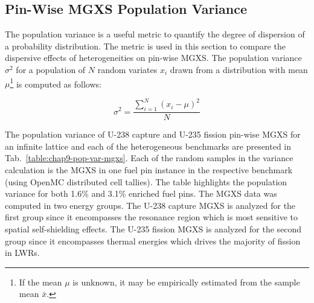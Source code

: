 \subsection{Pin-Wise MGXS Population Variance}
\label{subsec:chap9-pop-var}

The population variance is a useful metric to quantify the degree of dispersion of a probability distribution. The metric is used in this section to compare the dispersive effects of heterogeneities on pin-wise \ac{MGXS}. The population variance $\sigma^2$ for a population of $N$ random variates $x_{i}$ drawn from a distribution with mean $\mu$\footnote{If the mean $\mu$ is unknown, it may be empirically estimated from the sample mean $\bar{x}$.} is computed as follows:

\begin{equation}
\label{eqn:chap9-pop-var}
\sigma^2 = \frac{\displaystyle\sum\limits_{i=1}^{N}(x_{i} - \mu)^{2}}{N}
\end{equation}

The population variance of U-238 capture and U-235 fission pin-wise \ac{MGXS} for an infinite lattice and each of the heterogeneous benchmarks are presented in Tab.~\ref{table:chap9-pop-var-mgxs}. Each of the random samples in the variance calculation is the \ac{MGXS} in one fuel pin instance in the respective benchmark (using OpenMC distributed cell tallies). The table highlights the population variance for both 1.6\% and 3.1\% enriched fuel pins. The \ac{MGXS} data was computed in two energy groups. The U-238 capture \ac{MGXS} is analyzed for the first group since it encompasses the resonance region which is most sensitive to spatial self-shielding effects. The U-235 fission \ac{MGXS} is analyzed for the second group since it encompasses thermal energies which drives the majority of fission in \acp{LWR}.

